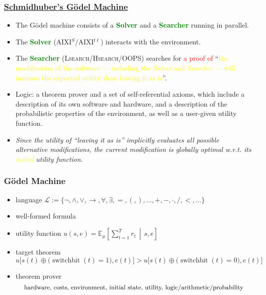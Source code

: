 \documentclass[UTF8,aspectratio=43,11pt,colorlinks,compress,openany]{beamer}%
\begin{document}
\begin{frame}\frametitle{\href{http://people.idsia.ch/~juergen/ultimatecognition.pdf}{Schmidhuber's G\"odel Machine}}
	\begin{block}{}
		\begin{itemize}
			\item The G\"odel machine consists of a \textcolor{green}{\textbf{Solver}} and a \textcolor{green}{\textbf{Searcher}} running in parallel.
			\item The \textcolor{green}{\textbf{Solver}} (AIXI$^S$/AIXI$^{t\ell}$) interacts with the environment.
			\item The \textcolor{green}{\textbf{Searcher}} (\textsc{Lsearch}/\textsc{Hsearch}/OOPS) searches for \textcolor{red}{a proof of} ``\textcolor{yellow}{the modification of the software --- including the \textit{Solver} and \textit{Searcher} --- will increase the expected utility than leaving it as is}''.
			\item Logic: a theorem prover and a set of self-referential axioms, which include a description of its own software and hardware, and a description of the probabilistic properties of the environment, as well as a user-given utility function.
			\item \emph{Since the utility of ``leaving it as is'' implicitly evaluates all possible alternative modifications, the current modification is globally optimal w.r.t. its \textcolor{yellow}{initial} utility function.}
		\end{itemize}
	\end{block}
\end{frame}

\begin{frame}\frametitle{G\"odel Machine}
\begin{itemize}
	\item language $\mathscr{L}:=\{\neg,\wedge,\vee,\to,\forall,\exists,=,(,),\ldots,+,-,\cdot,/,<,\ldots\}$
	\item well-formed formula
	\item utility function $u(s,e)=\mathbb{E}_\mu \left[\sum\limits_{t=1}^T r_t\,\middle|\,s,e\right]$
	\item target theorem
\[u\big[s(t)\oplus\big(\operatorname{switchbit}(t)=1\big), e(t)\big] > u\big[s(t)\oplus\big(\operatorname{switchbit}(t)=0\big), e(t)\big]\]
	\item theorem prover
	\[\text{\small hardware, costs, environment, initial state, utility, logic/arithmetic/probability}\]
\end{itemize}
\end{frame}
\end{document}
